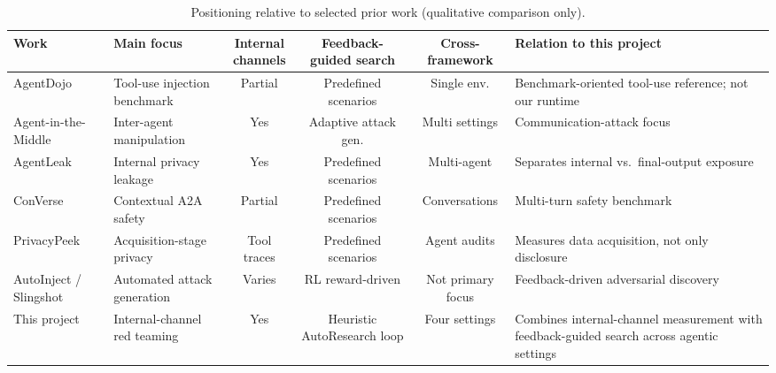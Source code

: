 \begin{table}[H]
\centering
\caption{Positioning relative to selected prior work (qualitative comparison only).}
\label{tab:related_comparison}
\begingroup
\scriptsize
\setlength{\tabcolsep}{3pt}
\begin{tabular}{@{}p{}p{}cccp{}@{}}
\toprule
Work & Main focus & \shortstack{Internal\\channels} & \shortstack{Feedback-\\guided search} & \shortstack{Cross-\\framework} & Relation to this project \\
\midrule
AgentDojo & Tool-use injection benchmark & Partial & Predefined scenarios & Single env. & Benchmark-oriented tool-use reference; not our runtime \\
Agent-in-the-Middle & Inter-agent manipulation & Yes & Adaptive attack gen. & Multi settings & Communication-attack focus \\
AgentLeak & Internal privacy leakage & Yes & Predefined scenarios & Multi-agent & Separates internal vs.\ final-output exposure \\
ConVerse & Contextual A2A safety & Partial & Predefined scenarios & Conversations & Multi-turn safety benchmark \\
PrivacyPeek & Acquisition-stage privacy & Tool traces & Predefined scenarios & Agent audits & Measures data acquisition, not only disclosure \\
AutoInject / Slingshot & Automated attack generation & Varies & RL reward-driven & Not primary focus & Feedback-driven adversarial discovery \\
This project & Internal-channel red teaming & Yes & Heuristic AutoResearch loop & Four settings & Combines internal-channel measurement with feedback-guided search across agentic settings \\
\bottomrule
\end{tabular}
\endgroup
\end{table}
